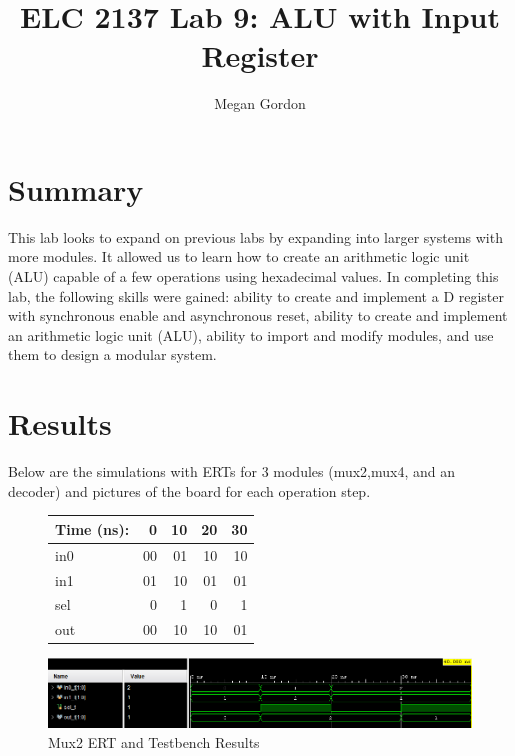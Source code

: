 \documentclass[11pt]{article}
\begin{document}
\title{ELC 2137 Lab 9: ALU with Input Register}
\author{Megan Gordon}

\maketitle


\section*{Summary}

This lab looks to expand on previous labs by expanding into larger systems with more modules. It allowed us to learn how to create an arithmetic logic unit (ALU) capable of a few operations using hexadecimal values. In completing this lab, the following skills were gained: ability to create and implement a D register with synchronous enable and asynchronous reset, ability to create and implement an arithmetic logic unit (ALU), ability to import and modify modules, and use them to design a modular system. 



\section*{Results}

Below are the simulations with ERTs for 3 modules (mux2,mux4, and an decoder) and pictures of the board for each operation step. 

\begin{figure}[ht]\centering
	\begin{tabular}{l|rrrr}
		Time (ns): & 0 & 10 & 20 & 30 \\
		\midrule
		in0 & 00 & 01 & 10 & 10 \\
		in1 & 01 & 10 & 01 & 01 \\
		sel & 0 & 1 & 0 & 1 \\
		\midrule
		out & 00 & 10 & 10 & 01 \\
		\bottomrule
	\end{tabular}\medskip

	\includegraphics[width=1.1\textwidth]{mux2sim.png}
	\caption{Mux2 ERT and Testbench Results}
	\label{fig:sim_with_table}
\end{figure}
\end{document}
